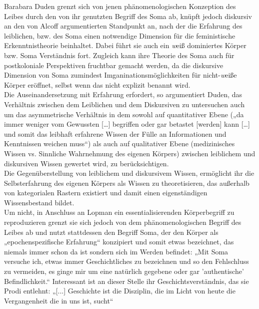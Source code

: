 Barabara Duden grenzt sich von jenen phänomenologischen Konzeption des Leibes
durch den von ihr genutzten Begriff des Soma ab, knüpft jedoch diskursiv an den
von Alcoff argumentierten Standpunkt an, nach der die Erfahrung des leiblichen,
bzw. des Soma einen notwendige Dimension für die feministische
Erkenntnistheorie beinhaltet. Dabei führt sie auch ein \textit{w}eiß dominiertes Körper
bzw. Soma Verständnis fort. Zugleich kann ihre Theorie des Soma auch für
postkoloniale Perspektiven fruchtbar gemacht werden, da die diskursive
Dimension von Soma zumindest Imganinationsmöglichkeiten für nicht-\textit{w}eiße Körper
eröffnet, selbst wenn das nicht explizit benannt wird.\\

\noindent Die Auseinandersetzung mit Erfahrung erfordert, so argumentiert Duden, das
Verhältnis zwischen dem Leiblichen und dem Diskursiven zu untersuchen auch um
das asymmetrische Verhältnis in dem sowohl auf quantitativer Ebene („da immer
weniger vom Gewussten […] begriffen oder gar betastet [werden] kann […] und
somit das leibhaft erfahrene Wissen der Fülle an Informationen und Kenntnissen
weichen muss“\footnotemark) als auch auf qualitativer Ebene (medizinisches Wissen vs.
Sinnliche Wahrnehmung des eigenen Körpers) zwischen leiblichem und diskursiven
Wissen gewertet wird, zu berücksichtigen.\\

\noindent Die Gegenüberstellung von leiblichem und diskursivem Wissen, ermöglicht ihr die
Selbsterfahrung des eigenen Körpers als Wissen zu theoretisieren, das außerhalb
von kategorialen Rastern existiert und damit einen eigenständigen
Wissensbestand bildet. \\
Um nicht, in Anschluss an Lopman ein essentialisierenden
Körperbegriff zu reproduzieren grenzt sie sich jedoch von dem
phänomenologischen Begriff des Leibes ab und nutzt stattdessen den Begriff
Soma, der den Körper als „epochenspezifische Erfahrung“\footnotemark
{} konzipiert und somit
etwas bezeichnet, das niemals immer schon da ist sondern sich im Werden
befindet: „Mit Soma versuche ich, etwas immer Geschichtliches zu bezeichnen und
so den Fehlschluss zu vermeiden, es ginge mir um eine natürlich gegebene oder
gar 'authentische' Befindlichkeit.“\footnotemark{} Interessant ist an dieser Stelle ihr
Geschichtsverständnis, das sie Prodi entlehnt: „[...] Geschichte ist die
Disziplin, die im Licht von heute die Vergangenheit die in uns ist, sucht“\footnotemark {}\\

